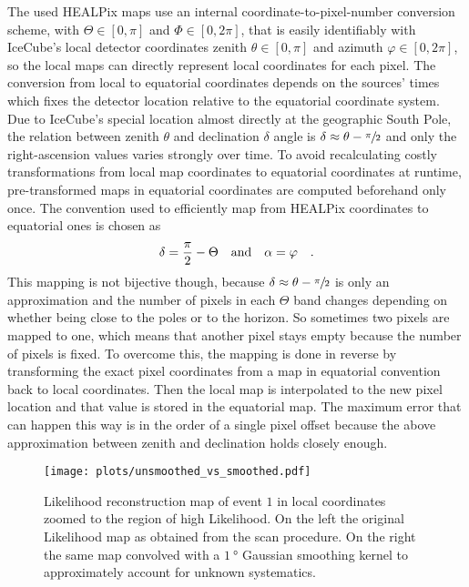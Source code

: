 The used HEALPix maps use an internal coordinate-to-pixel-number conversion scheme, with $\Theta\in[0, \pi]$ and $\Phi\in[0, 2\pi]$, that is easily identifiably with IceCube's local detector coordinates zenith $\theta\in[0, \pi]$ and azimuth $\varphi\in[0, 2\pi]$, so the local maps can directly represent local coordinates for each pixel.
The conversion from local to equatorial coordinates depends on the sources' times which fixes the detector location relative to the equatorial coordinate system.
Due to IceCube's special location almost directly at the geographic South Pole, the relation between zenith $\theta$ and declination $\delta$ angle is $\delta \approx \theta - \sfrac{\pi}{2}$ and only the right-ascension values varies strongly over time.
To avoid recalculating costly transformations from local map coordinates to equatorial coordinates at runtime, pre-transformed maps in equatorial coordinates are computed beforehand only once.
The convention used to efficiently map from HEALPix coordinates to equatorial ones is chosen as
\begin{equation}
  \delta = \frac{\pi}{2} - \Theta \quad\text{and}\quad \alpha = \varphi
  \quad\text{.}
\end{equation}
This mapping is not bijective though, because $\delta \approx \theta - \sfrac{\pi}{2}$ is only an approximation and the number of pixels in each $\Theta$ band changes depending on whether being close to the poles or to the horizon.
So sometimes two pixels are mapped to one, which means that another pixel stays empty because the number of pixels is fixed.
To overcome this, the mapping is done in reverse by transforming the exact pixel coordinates from a map in equatorial convention back to local coordinates.
Then the local map is interpolated to the new pixel location and that value is stored in the equatorial map.
The maximum error that can happen this way is in the order of a single pixel offset because the above approximation between zenith and declination holds closely enough.

\begin{figure}[htbp]
  \centering
  \texttt{[image: plots/unsmoothed\_vs\_smoothed.pdf]}
  \caption[Likelihood reconstruction map before and after smoothing]{
    Likelihood reconstruction map of event $1$ in local coordinates zoomed to the region of high Likelihood.
    On the left the original Likelihood map as obtained from the scan procedure.
    On the right the same map convolved with a $\SI{1}{\degree}$ Gaussian smoothing kernel to approximately account for unknown systematics.
  }
  \label{fig:unsmoothed_vs_smoothed}
\end{figure}

